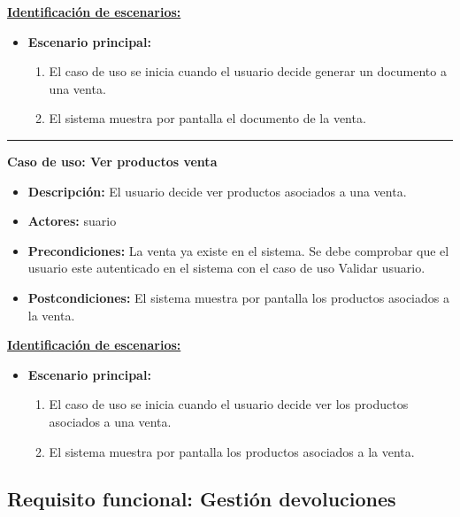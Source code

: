 \underline{\textbf{Identificación de escenarios:}}
\begin{itemize}\renewcommand{\labelitemi}{$\circ$}
 \item \textbf{Escenario principal:}
         \begin{enumerate}
          \item El caso de uso se inicia cuando el usuario decide generar un documento a una venta.
	  \item El sistema muestra por pantalla el documento de la venta.
         \end{enumerate}
\end{itemize}
\smallskip
\hrule height 1pt
\smallskip
\textbf{Caso de uso: Ver productos venta}
\begin{itemize}\renewcommand{\labelitemi}{$\cdot$}
 \item \textbf{Descripción:} El usuario decide ver productos asociados a una venta.
  \item \textbf{Actores:} suario
  \item \textbf{Precondiciones:} La venta ya existe en el sistema. Se debe comprobar que el usuario este autenticado en el sistema con el caso de uso Validar usuario.
  \item \textbf{Postcondiciones:} El sistema muestra por pantalla los productos asociados a la venta.
\end{itemize}
\underline{\textbf{Identificación de escenarios:}}
\begin{itemize}\renewcommand{\labelitemi}{$\circ$}
 \item \textbf{Escenario principal:}
         \begin{enumerate}
          \item El caso de uso se inicia cuando el usuario decide ver los productos asociados a una venta.
	  \item El sistema muestra por pantalla los productos asociados a la venta.
         \end{enumerate}
\end{itemize}

\subsection{Requisito funcional: Gestión devoluciones}

